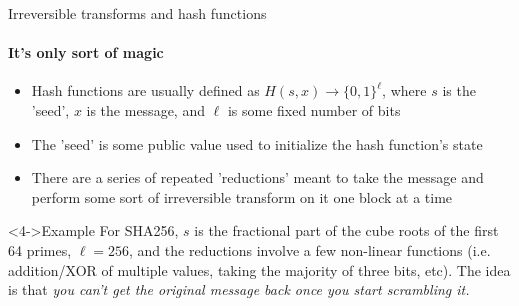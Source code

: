 \begin{frame}{Irreversible transforms and hash functions}
    \framesubtitle{It's only sort of magic}
    \begin{itemize}
        \item<1-> Hash functions are usually defined as
                  $H(s, x) \rightarrow \{0, 1\}^\ell$, where $s$ is the 'seed',
                  $x$ is the message, and $\ell$ is some fixed number of bits
        \item<2-> The 'seed' is some public value used to initialize the hash
                  function's state
        \item<3-> There are a series of repeated 'reductions' meant to take the
                  message and perform some sort of irreversible transform on it
                  one block at a time
    \end{itemize}
    \begin{block}<4->{Example}
        For SHA256, $s$ is the fractional part of the cube roots of the first
        64 primes, $\ell = 256$, and the reductions involve a few non-linear
        functions (i.e. addition/XOR of multiple values, taking the majority of
        three bits, etc). The idea is that {\em you can't get the original
        message back once you start scrambling it.}
    \end{block}
\end{frame}

\begin{comment}

\begin{frame}{But, this is a CTF\ldots}
    \begin{itemize}
        \item<1-> They wouldn't hash the flag with a strong hash function and
                  expect us to break it
        \item<2-> The hash function has to fit in 512 bytes of x86 instructions
        \item<3-> So\ldots{} we can expect that we have to reverse engineer the
                  hash function to recover the flag
    \end{itemize}
\end{frame}
\end{comment}
